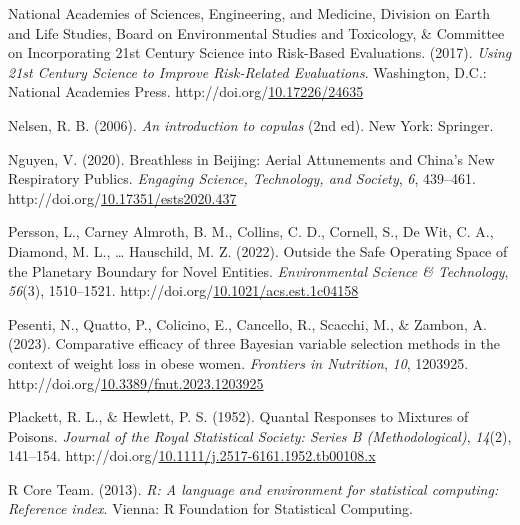 \documentclass[12pt, twoside]{amherstthesis}
\newenvironment{CSLReferences}[2]%
  {}%
  {\par}
\begin{document}
\begin{CSLReferences}{1}{0}
\leavevmode{}%
National Academies of Sciences, Engineering, and Medicine, Division on Earth and Life Studies, Board on Environmental Studies and Toxicology, \& Committee on Incorporating 21st Century Science into Risk-Based Evaluations. (2017). \emph{Using 21st {Century} {Science} to {Improve} {Risk}-{Related} {Evaluations}}. Washington, D.C.: National Academies Press. http://doi.org/\href{https://doi.org/10.17226/24635}{10.17226/24635}

\leavevmode{}%
Nelsen, R. B. (2006). \emph{An introduction to copulas} (2nd ed). New York: Springer.

\leavevmode{}%
Nguyen, V. (2020). Breathless in {Beijing}: {Aerial} {Attunements} and {China}'s {New} {Respiratory} {Publics}. \emph{Engaging Science, Technology, and Society}, \emph{6}, 439--461. http://doi.org/\href{https://doi.org/10.17351/ests2020.437}{10.17351/ests2020.437}

\leavevmode{}%
Persson, L., Carney Almroth, B. M., Collins, C. D., Cornell, S., De Wit, C. A., Diamond, M. L., \ldots{} Hauschild, M. Z. (2022). Outside the {Safe} {Operating} {Space} of the {Planetary} {Boundary} for {Novel} {Entities}. \emph{Environmental Science \& Technology}, \emph{56}(3), 1510--1521. http://doi.org/\href{https://doi.org/10.1021/acs.est.1c04158}{10.1021/acs.est.1c04158}

\leavevmode{}%
Pesenti, N., Quatto, P., Colicino, E., Cancello, R., Scacchi, M., \& Zambon, A. (2023). Comparative efficacy of three {Bayesian} variable selection methods in the context of weight loss in obese women. \emph{Frontiers in Nutrition}, \emph{10}, 1203925. http://doi.org/\href{https://doi.org/10.3389/fnut.2023.1203925}{10.3389/fnut.2023.1203925}

\leavevmode{}%
Plackett, R. L., \& Hewlett, P. S. (1952). Quantal {Responses} to {Mixtures} of {Poisons}. \emph{Journal of the Royal Statistical Society: Series B (Methodological)}, \emph{14}(2), 141--154. http://doi.org/\href{https://doi.org/10.1111/j.2517-6161.1952.tb00108.x}{10.1111/j.2517-6161.1952.tb00108.x}

\leavevmode{}%
R Core Team. (2013). \emph{R: A language and environment for statistical computing: Reference index}. Vienna: R Foundation for Statistical Computing.


\end{CSLReferences}
\end{document}
